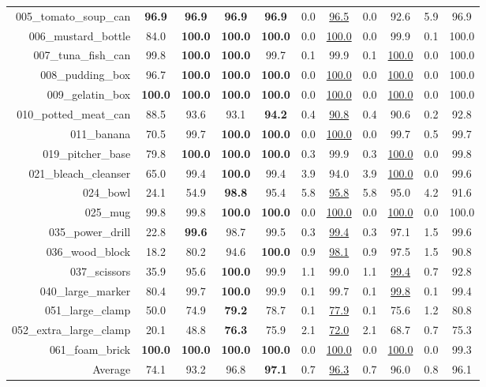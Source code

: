 \documentclass[runningheads]{llncs}
\begin{document}
\begin{table}[thpb]
{\begin{tabular}{r|c|c|c|cc||cc|cc||c}
005\_tomato\_soup\_can & \textbf{96.9} & \textbf{96.9} & \textbf{96.9} & \textbf{96.9} & 0.0 & \underline{96.5} & 0.0 & 92.6 & 5.9 & 96.9 \\
006\_mustard\_bottle & 84.0 & \textbf{100.0} & \textbf{100.0} & \textbf{100.0} & 0.0 & \underline{100.0} & 0.0 & 99.9 & 0.1 & 100.0 \\
007\_tuna\_fish\_can & 99.8 & \textbf{100.0} & \textbf{100.0} & 99.7 & 0.1 & 99.9 & 0.1 & \underline{100.0} & 0.0 & 100.0 \\ 
008\_pudding\_box & 96.7 & \textbf{100.0} & \textbf{100.0} & \textbf{100.0} & 0.0 & \underline{100.0} & 0.0 & \underline{100.0} & 0.0 & 100.0 \\
009\_gelatin\_box & \textbf{100.0} & \textbf{100.0} & \textbf{100.0} & \textbf{100.0} & 0.0 & \underline{100.0} & 0.0 & \underline{100.0} & 0.0 & 100.0 \\ 
010\_potted\_meat\_can & 88.5 & 93.6 & 93.1 & \textbf{94.2} & 0.4 & \underline{90.8} & 0.4 & 90.6 & 0.2 & 92.8 \\
011\_banana & 70.5 & 99.7 & \textbf{100.0} & \textbf{100.0} & 0.0 & \underline{100.0} & 0.0 & 99.7 & 0.5 & 99.7 \\
019\_pitcher\_base & 79.8 & \textbf{100.0} & \textbf{100.0} & \textbf{100.0} & 0.3 & 99.9 & 0.3 & \underline{100.0} & 0.0 & 99.8 \\
021\_bleach\_cleanser & 65.0 & 99.4 & \textbf{100.0} & 99.4 & 3.9 & 94.0 & 3.9 & \underline{100.0} & 0.0 & 99.6 \\
024\_bowl & 24.1 & 54.9 & \textbf{98.8} & 95.4 & 5.8 & \underline{95.8} & 5.8 & 95.0 & 4.2 & 91.6 \\
025\_mug & 99.8 & 99.8 & \textbf{100.0} & \textbf{100.0} & 0.0 & \underline{100.0} & 0.0 & \underline{100.0} & 0.0 & 100.0 \\
035\_power\_drill & 22.8 & \textbf{99.6} & 98.7 & 99.5 & 0.3 & \underline{99.4} & 0.3 & 97.1 & 1.5 & 99.6 \\
036\_wood\_block & 18.2 & 80.2 & 94.6 & \textbf{100.0} & 0.9 & \underline{98.1} & 0.9 & 97.5 & 1.5 & 90.8 \\
037\_scissors & 35.9 & 95.6 & \textbf{100.0} & 99.9 & 1.1 & 99.0 & 1.1 & \underline{99.4} & 0.7 & 92.8 \\
040\_large\_marker & 80.4 & 99.7 & \textbf{100.0} & 99.9 & 0.1 & 99.7 & 0.1 & \underline{99.8} & 0.1 & 99.4 \\
051\_large\_clamp & 50.0 & 74.9 & \textbf{79.2} & 78.7 & 0.1 & \underline{77.9} & 0.1 & 75.6 & 1.2 & 80.8 \\
052\_extra\_large\_clamp & 20.1 & 48.8 & \textbf{76.3} & 75.9 & 2.1 & \underline{72.0} & 2.1 & 68.7 & 0.7 & 75.3 \\
061\_foam\_brick & \textbf{100.0} & \textbf{100.0} & \textbf{100.0} & \textbf{100.0} & 0.0 & \underline{100.0} & 0.0 & \underline{100.0} & 0.0 & 99.3 \\ \hline 
Average & 74.1 & 93.2 & 96.8 & \textbf{97.1} & 0.7 & \underline{96.3} & 0.7 & 96.0 & 0.8 & 96.1
\end{tabular}}
\end{table}
\end{document}
